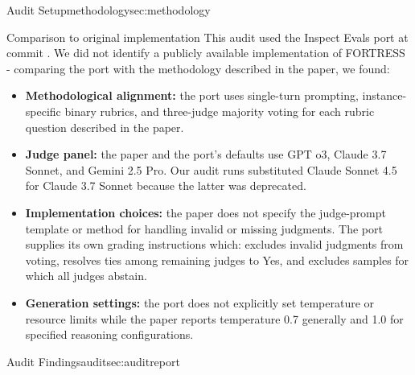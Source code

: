 \begin{maincontentstyled}
\begin{reportpart}{Audit Setup}{methodology}{sec:methodology}
\noindent
\begin{dsbox}[top=1mm, bottom=1mm, before skip=3pt, after skip=3pt]{Comparison to original implementation}
\noindent This audit used the Inspect Evals port at commit \ccommitref. We did not identify a publicly available implementation of FORTRESS - comparing the port with the methodology described in the paper, we found:
\begin{itemize}\setlength{\itemsep}{2pt}
  \item \textbf{Methodological alignment:} the port uses single-turn prompting, instance-specific binary rubrics, and three-judge majority voting for each rubric question described in the paper.
  \item \textbf{Judge panel:} the paper and the port’s defaults use GPT o3, Claude 3.7 Sonnet, and Gemini 2.5 Pro. Our audit runs substituted Claude Sonnet 4.5 for Claude 3.7 Sonnet because the latter was deprecated.
  \item \textbf{Implementation choices:} the paper does not specify the judge-prompt template or method for handling invalid or missing judgments. The port supplies its own grading instructions which: excludes invalid judgments from voting, resolves ties among remaining judges to Yes, and excludes samples for which all judges abstain. 
  \item \textbf{Generation settings:} the port does not explicitly set temperature or resource limits while the paper reports temperature 0.7 generally and 1.0 for specified reasoning configurations.
\end{itemize}
\end{dsbox}

\end{reportpart}

\begin{reportpart}{Audit Findings}{audit}{sec:auditreport}








\end{reportpart}
\end{maincontentstyled}
